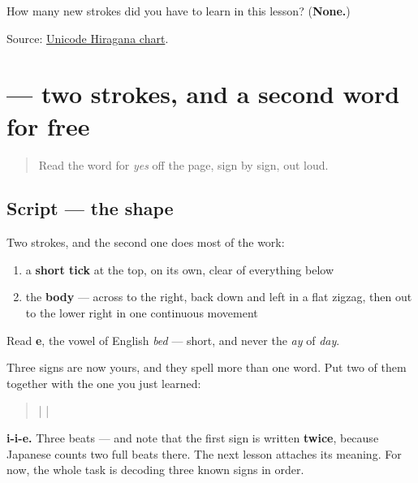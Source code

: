 \begin{tcolorbox}[breakable,colback=teal!4,colframe=teal!35!black,title={Before you move on}]
How many new strokes did you have to learn in this lesson? (\textbf{None.})

Source: \href{https://www.unicode.org/charts/PDF/U3040.pdf}{Unicode Hiragana chart}.
\end{tcolorbox}
\section[\texorpdfstring{\ja{え} (e)}{え (e)}]{ — two strokes, and a second word for free}

\label{lesson:JA-W01-e}



\begin{quote}
Read the word for \emph{yes} off the page, sign by sign, out loud.
\end{quote}

\subsection*{Script — the shape}

\begin{quote}
\end{quote}

Two strokes, and the second one does most of the work:

\begin{enumerate}
\raggedright
  \item a \textbf{short tick} at the top, on its own, clear of everything below
  \item the \textbf{body} — across to the right, back down and left in a flat zigzag, then out to the lower right in one continuous movement
\end{enumerate}

Read \textbf{e}, the vowel of English \emph{bed} — short, and never the \emph{ay} of \emph{day}.

\begin{grammarlens}[title={What you've built}]
Three signs are now yours, and they spell more than one word. Put two of them together with the one you just learned:

\begin{quote}
\textbf{} | \textbf{} | \textbf{}
\end{quote}

\textbf{i-i-e.} Three beats — and note that the first sign is written \textbf{twice}, because Japanese counts two full beats there. The next lesson attaches its meaning. For now, the whole task is decoding three known signs in order.
\end{grammarlens}

